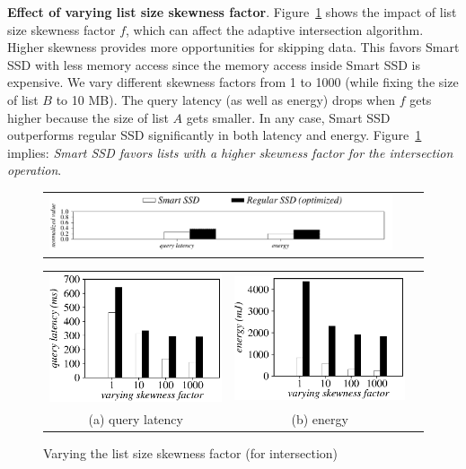 \textbf{Effect of varying list size skewness factor}.
Figure~\ref{fig:varyListSkewIntersection} shows the impact of list size skewness factor $f$, which can affect the adaptive intersection algorithm.
Higher skewness provides more opportunities for skipping data. This favors Smart SSD with less memory access since the memory access inside Smart SSD is expensive.
We vary different skewness factors from 1 to 1000 (while fixing the size of list $B$ to 10 MB). The query latency (as well as energy) drops when $f$ gets higher because the size of list $A$ gets smaller. In any case, Smart SSD outperforms regular SSD significantly in both latency and energy.
Figure~\ref{fig:varyListSkewIntersection} implies: \emph{Smart SSD favors lists with a higher skewness factor for the \textsf{intersection} operation}.

\begin{figure}[tbp]
  \centering
    \begin{tabular}{ccc}
 \includegraphics[width=0.52\columnwidth]{figures/banner2.pdf}%
\end{tabular}
\vspace{-0.1cm}
\renewcommand{\tabcolsep}{0.1mm}


  \begin{tabular}{ccc}
 \includegraphics[width=0.5\columnwidth]{figures/Intersection-time-VaryListSkew2.eps}&
  \includegraphics[width=0.5\columnwidth]{figures/Intersection-energy-VaryListSkew2.eps}\\
  (a) query latency & (b) energy\\
\end{tabular}

  \caption{Varying the list size skewness factor (for intersection)}
  \label{fig:varyListSkewIntersection}
 \end{figure}


